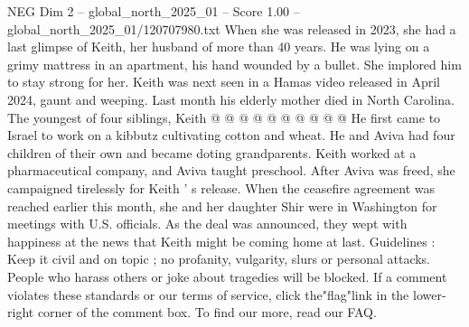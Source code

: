 \begin{textsample}{NEG Dim 2 – global\_north\_2025\_01 – Score 1.00 – global\_north\_2025\_01/120707980.txt}
When she was released in 2023, she had a last glimpse of Keith, her husband of more than 40 years.
He was lying on a grimy mattress in an apartment, his hand wounded by a bullet.
She implored him to stay strong for her.
Keith was next seen in a Hamas video released in April 2024, gaunt and weeping.
Last month his elderly mother died in North Carolina.
The youngest of four siblings, Keith @ @ @ @ @ @ @ @ @ @ He first came to Israel to work on a kibbutz cultivating cotton and wheat.
He and Aviva had four children of their own and became doting grandparents.
Keith worked at a pharmaceutical company, and Aviva taught preschool.
After Aviva was freed, she campaigned tirelessly for Keith ' s release.
When the ceasefire agreement was reached earlier this month, she and her daughter Shir were in Washington for meetings with U.S. officials.
As the deal was announced, they wept with happiness at the news that Keith might be coming home at last.
Guidelines : Keep it civil and on topic ; no profanity, vulgarity, slurs or personal attacks.
People who harass others or joke about tragedies will be blocked.
If a comment violates these standards or our terms of service, click the"flag"link in the lower-right corner of the comment box.
To find our more, read our FAQ.

\end{textsample}
